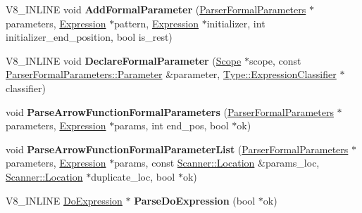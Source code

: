 \begin{DoxyCompactItemize}
\item 
V8\+\_\+\+I\+N\+L\+I\+NE void {\bfseries Add\+Formal\+Parameter} (\hyperlink{structv8_1_1internal_1_1_parser_formal_parameters}{Parser\+Formal\+Parameters} $\ast$parameters, \hyperlink{classv8_1_1internal_1_1_expression}{Expression} $\ast$pattern, \hyperlink{classv8_1_1internal_1_1_expression}{Expression} $\ast$initializer, int initializer\+\_\+end\+\_\+position, bool is\+\_\+rest)\hypertarget{classv8_1_1internal_1_1_parser_traits_add45de04bcff1c95ec7f507d93b54f0b}{}\label{classv8_1_1internal_1_1_parser_traits_add45de04bcff1c95ec7f507d93b54f0b}

\item 
V8\+\_\+\+I\+N\+L\+I\+NE void {\bfseries Declare\+Formal\+Parameter} (\hyperlink{classv8_1_1internal_1_1_scope}{Scope} $\ast$scope, const \hyperlink{structv8_1_1internal_1_1_parser_formal_parameters_1_1_parameter}{Parser\+Formal\+Parameters\+::\+Parameter} \&parameter, \hyperlink{classv8_1_1internal_1_1_expression_classifier}{Type\+::\+Expression\+Classifier} $\ast$classifier)\hypertarget{classv8_1_1internal_1_1_parser_traits_afe6d2d29266c565ef1432cc8b8055c15}{}\label{classv8_1_1internal_1_1_parser_traits_afe6d2d29266c565ef1432cc8b8055c15}

\item 
void {\bfseries Parse\+Arrow\+Function\+Formal\+Parameters} (\hyperlink{structv8_1_1internal_1_1_parser_formal_parameters}{Parser\+Formal\+Parameters} $\ast$parameters, \hyperlink{classv8_1_1internal_1_1_expression}{Expression} $\ast$params, int end\+\_\+pos, bool $\ast$ok)\hypertarget{classv8_1_1internal_1_1_parser_traits_a8c755b657656db826d0f95990b59f114}{}\label{classv8_1_1internal_1_1_parser_traits_a8c755b657656db826d0f95990b59f114}

\item 
void {\bfseries Parse\+Arrow\+Function\+Formal\+Parameter\+List} (\hyperlink{structv8_1_1internal_1_1_parser_formal_parameters}{Parser\+Formal\+Parameters} $\ast$parameters, \hyperlink{classv8_1_1internal_1_1_expression}{Expression} $\ast$params, const \hyperlink{structv8_1_1internal_1_1_scanner_1_1_location}{Scanner\+::\+Location} \&params\+\_\+loc, \hyperlink{structv8_1_1internal_1_1_scanner_1_1_location}{Scanner\+::\+Location} $\ast$duplicate\+\_\+loc, bool $\ast$ok)\hypertarget{classv8_1_1internal_1_1_parser_traits_ac079aab932f768c0ecc5f485adf421d7}{}\label{classv8_1_1internal_1_1_parser_traits_ac079aab932f768c0ecc5f485adf421d7}

\item 
V8\+\_\+\+I\+N\+L\+I\+NE \hyperlink{classv8_1_1internal_1_1_do_expression}{Do\+Expression} $\ast$ {\bfseries Parse\+Do\+Expression} (bool $\ast$ok)\hypertarget{classv8_1_1internal_1_1_parser_traits_a805f1098682d6d6dbe001c92938edfc4}{}\label{classv8_1_1internal_1_1_parser_traits_a805f1098682d6d6dbe001c92938edfc4}


\end{DoxyCompactItemize}

